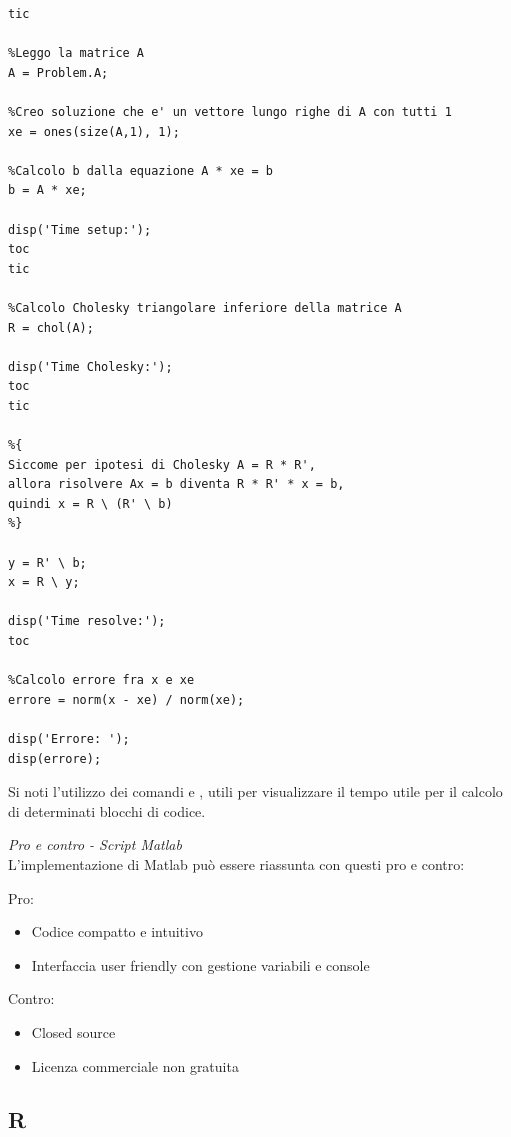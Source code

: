 \documentclass[preprint,12pt]{elsarticle}
\begin{document}
\begin{lstlisting}
tic

%Leggo la matrice A
A = Problem.A;

%Creo soluzione che e' un vettore lungo righe di A con tutti 1
xe = ones(size(A,1), 1);

%Calcolo b dalla equazione A * xe = b
b = A * xe;

disp('Time setup:');
toc
tic

%Calcolo Cholesky triangolare inferiore della matrice A 
R = chol(A);

disp('Time Cholesky:');
toc
tic

%{
Siccome per ipotesi di Cholesky A = R * R',
allora risolvere Ax = b diventa R * R' * x = b,
quindi x = R \ (R' \ b)
%}

y = R' \ b;
x = R \ y;

disp('Time resolve:');
toc

%Calcolo errore fra x e xe
errore = norm(x - xe) / norm(xe);

disp('Errore: ');
disp(errore);

\end{lstlisting}

Si noti l'utilizzo dei comandi  e , utili per visualizzare il tempo utile per il calcolo di determinati blocchi di codice.\\


\medskip

\textit{Pro e contro - Script Matlab}\\
\vspace{4mm}
L'implementazione di Matlab può essere riassunta con questi pro e contro:

Pro:
\begin{itemize}
	\item Codice compatto e intuitivo
	\item Interfaccia user friendly con gestione variabili e console
\end{itemize}

Contro:
\begin{itemize}
	\item Closed source
	\item Licenza commerciale non gratuita
\end{itemize}

\newpage

\subsection*{R}
\end{document}

